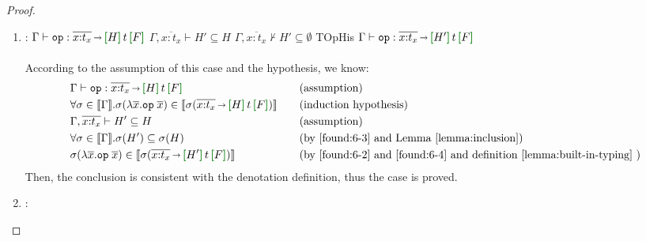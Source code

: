 \begin{proof}
\begin{enumerate}[label=Case]
According to the assumption of this case and the hypothesis, we know:
{\footnotesize\begin{alignat}{2}
  \setcounter{equation}{0}
  &\Gamma\vdash e : \tau \ptag{assumption} \label{found:5-1} \\
  &\forall \sigma \in \denot{\Gamma}. \sigma(e) \in \denot{\sigma(\tau)} \ptag{induction hypothesis} \label{found:5-2} \\
  &\Gamma\vdash \tau <: \tau' \ptag{assumption} \label{found:5-3} \\
  &\sigma(e) \in \denot{\sigma(\tau')} \ptag{by \ref{found:5-2} and \ref{found:5-3} and Lemma~\ref{lemma:subtyping}} \label{found:5-4}
  \end{alignat}}\noindent
Then, the conclusion is consistent with the denotation definition, thus the case is proved.
\item:
{\footnotesize
\mprooftr{38mm}
{$\Gamma \vdash \eff{op} : \overline{x{:}t_x}\sarr\uhat{H}{t}{F}$ \quad
$\Gamma,\overline{x{:}t_x} \vdash H' \subseteq H$
\quad
$\Gamma,\overline{x{:}t_x} \not\vdash H' \subseteq \emptyset$}
{TOpHis}
{$\Gamma\vdash \eff{op} : \overline{x{:}t_x}\sarr\uhat{H'}{t}{F}$}
\ \\ \ \\}
According to the assumption of this case and the hypothesis, we know:
{\footnotesize\begin{alignat}{2}
  \setcounter{equation}{0}
  &\Gamma \vdash \eff{op} : \overline{x{:}t_x}\sarr\uhat{H}{t}{F} \ptag{assumption} \label{found:6-1} \\
  &\forall \sigma \in \denot{\Gamma}. \sigma(\lambda \overline{x}.\eff{op}\;\overline{x}) \in \denot{\sigma(\overline{x{:}t_x}\sarr\uhat{H}{t}{F})} \ptag{induction hypothesis} \label{found:6-2} \\
  &\Gamma,\overline{x{:}t_x} \vdash H' \subseteq H \ptag{assumption} \label{found:6-3} \\
  &\forall \sigma \in \denot{\Gamma}. \sigma(H') \subseteq \sigma(H) \ptag{by \ref{found:6-3} and Lemma~\ref{lemma:inclusion}} \label{found:6-4} \\
  &\sigma(\lambda \overline{x}.\eff{op}\;\overline{x}) \in \denot{\sigma(\overline{x{:}t_x}\sarr\uhat{H'}{t}{F})} \ptag{by \ref{found:6-2} and \ref{found:6-4} and definition~\ref{lemma:built-in-typing} } \label{found:6-5}
  \end{alignat}}\noindent
Then, the conclusion is consistent with the denotation definition, thus the case is proved.
\item:
{\footnotesize
\mprooftr{17mm}
}
\end{enumerate}
\end{proof}
